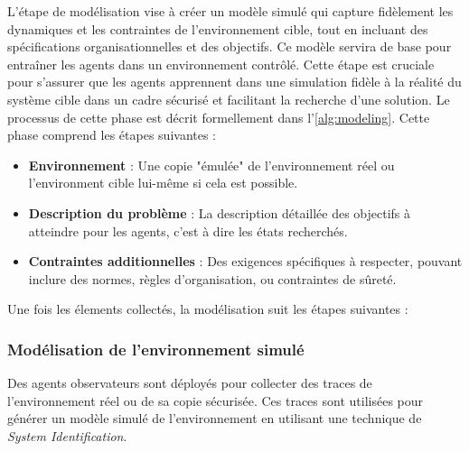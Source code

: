 \documentclass[sigconf,anonymous]{aamas}
\begin{document}
L'étape de modélisation vise à créer un modèle simulé qui capture fidèlement les dynamiques et les contraintes de l'environnement cible, tout en incluant des spécifications organisationnelles et des objectifs. Ce modèle servira de base pour entraîner les agents dans un environnement contrôlé. Cette étape est cruciale pour s'assurer que les agents apprennent dans une simulation fidèle à la réalité du système cible dans un cadre sécurisé et facilitant la recherche d'une solution. Le processus de cette phase est décrit formellement dans l'\autoref{alg:modeling}. Cette phase comprend les étapes suivantes :
\begin{itemize}
    \item \textbf{Environnement} : Une copie "émulée" de l'environnement réel ou l'environment cible lui-même si cela est possible.
    \item \textbf{Description du problème} : La description détaillée des objectifs à atteindre pour les agents, c'est à dire les états recherchés.
    \item \textbf{Contraintes additionnelles} : Des exigences spécifiques à respecter, pouvant inclure des normes, règles d'organisation, ou contraintes de sûreté.
\end{itemize}

Une fois les élements collectés, la modélisation suit les étapes suivantes :

\subsubsection{Modélisation de l'environnement simulé}
  
Des agents observateurs sont déployés pour collecter des traces de l'environnement réel ou de sa copie sécurisée. Ces traces sont utilisées pour générer un modèle simulé de l'environnement en utilisant une technique de \textit{System Identification}.
\end{document}
